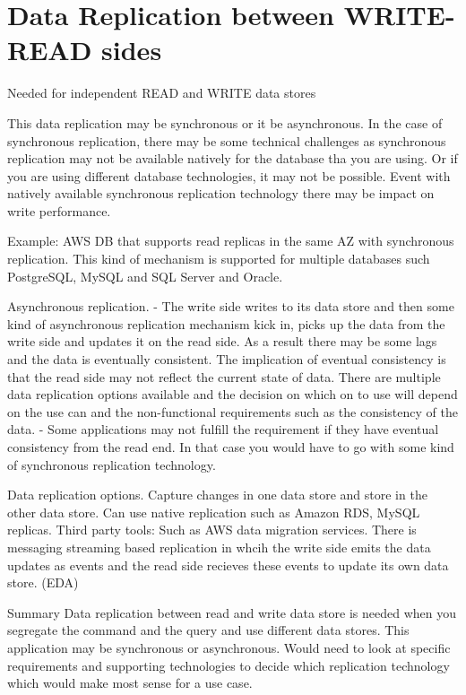 \section{Data Replication between WRITE-READ sides}
Needed for independent READ and WRITE data stores

This data replication may be synchronous or it be asynchronous.
In the case of synchronous replication, there may be some technical challenges as synchronous replication may not be available natively for the database tha you are using.
Or if you are using different database technologies, it may not be possible.
Event with natively available synchronous replication technology there may be impact on write performance.

Example: AWS DB that supports read replicas in the same AZ with synchronous replication.
This kind of mechanism is supported for multiple databases such PostgreSQL, MySQL and SQL Server and Oracle.

Asynchronous replication.
- The write side writes to its data store and then some kind of asynchronous replication mechanism kick in, picks up the data from the write side and updates it on the read side.
As a result there may be some lags and the data is eventually consistent.
The implication of eventual consistency is that the read side may not reflect the current state of data.
There are multiple data replication options available and the decision on which on to use will depend on the use can and the non-functional requirements such as the consistency of the data.
- Some applications may not fulfill the requirement if they have eventual consistency from the read end.
In that case you would have to go with some kind of synchronous replication technology.

Data replication options.
Capture changes in one data store and store in the other data store.
Can use native replication such as Amazon RDS, MySQL replicas.
Third party tools: Such as AWS data migration services.
There is messaging streaming based replication in whcih the write side emits the data updates as events and the read side recieves these events to update its own data store. (EDA)

Summary
Data replication between read and write data store is needed when you segregate the command and the query and use different data stores.
This application may be synchronous or asynchronous.
Would need to look at specific requirements and supporting technologies to decide which replication technology which would make most sense for a use case.

